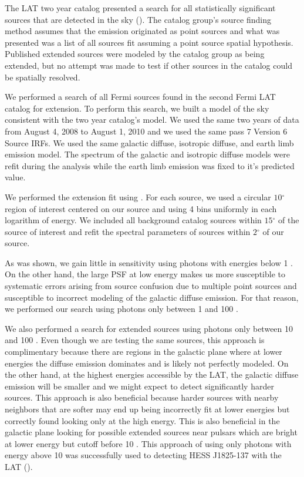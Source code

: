 \documentclass[12pt,preprint]{aastex}
\newcommand{\gev}{\text{GeV}\xspace}
\renewcommand{\deg}{\ensuremath{^\circ}\xspace}
\newcommand{\pointlike}{\text{\em pointlike}\xspace}
\begin{document}
The LAT two year catalog presented a search for all statistically
significant sources that are detected in the \gev sky (\cite{second_cat}).
The catalog group's source finding method assumes that the emission
originated as point sources and what was presented was a list of all
sources fit assuming a point source spatial hypothesis.  Published
extended sources were modeled by the catalog group as being extended,
but no attempt was made to test if other sources in the catalog could
be spatially resolved.

We performed a search of all Fermi sources found in the second Fermi LAT
catalog for extension.  To perform this search, we built a model of the
sky consistent with the two year catalog's model.   We used the same two
years of data from August 4, 2008 to August 1, 2010 and we used the same
pass 7 Version 6 Source IRFs.  We used the same galactic diffuse,
isotropic diffuse, and earth limb emission model. The spectrum of the
galactic and isotropic diffuse models were refit during the analysis
while the earth limb emission was fixed to it's predicted value.

We performed the extension fit using \pointlike.  For each source, we
used a circular $10\deg$ region of interest centered on our source and
using 4 bins uniformly in each logarithm of energy.  We included all
background catalog sources within $15\deg$ of the source of interest
and refit the spectral parameters of sources within $2\deg$ of our source.

As was shown, we gain little in sensitivity using photons with energies
below 1 \gev. On the other hand, the large PSF at low energy makes us
more susceptible to systematic errors arising from source confusion due
to multiple point sources and susceptible to incorrect modeling of the
galactic diffuse emission.  For that reason, we performed our search
using photons only between 1 \gev and 100 \gev.

We also performed a search for extended sources using photons only between
10 \gev and 100 \gev. Even though we are testing the same sources, this
approach is complimentary because there are regions in the galactic
plane where at lower energies the diffuse emission dominates and is
likely not perfectly modeled. On the other hand, at the highest energies
accessible by the LAT, the galactic diffuse emission will be smaller and
we might expect to detect significantly harder sources. This approach is
also beneficial because harder sources with nearby neighbors that are
softer may end up being incorrectly fit at lower energies but correctly
found looking only at the high energy.  This is also beneficial in the
galactic plane looking for possible extended sources near pulsars which
are bright at lower energy but cutoff before 10 \gev.  This approach
of using only photons with energy above 10 \gev was successfully used
to detecting HESS J1825-137 with the LAT (\cite{fermi_hess_j1825}).
\end{document}
